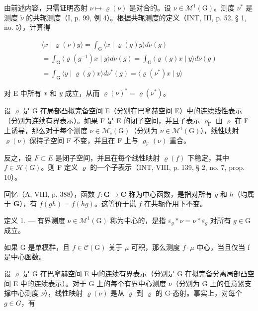 由前述内容，只需证明态射 \(\nu \mapsto \varrho(\nu)\) 是对合的。设 \(\nu \in \mathcal{M}^{1}(\mathrm{G})\)。测度 \(\nu^{*}\) 是测度 \(\check{\nu}\) 的共轭测度（I, p. 99, 例 4）。根据共轭测度的定义（INT, III, p. 52, § 1, no. 5），计算得

\[
\begin{array}{c} \langle x \mid \varrho (\nu) y \rangle = \int_ {\mathrm{G}} \langle x \mid \varrho (g) y \rangle d \nu (g) \\ = \int_ {\mathrm{G}} \langle \varrho (g ^ {- 1}) x \mid y \rangle d \nu (g) = \int_ {\mathrm{G}} \langle \varrho (g) x \mid y \rangle d \check {\nu} (g) \\ = \overline {{\int_ {\mathrm{G}} \langle y \mid \varrho (g) x \rangle d \nu^ {*} (g)}} = \langle \varrho (\nu^ {*}) x \mid y \rangle \end{array}
\]

对 E 中所有 \(x\) 和 \(y\) 成立，从而 \(\varrho(\nu)^{*} = \varrho(\nu^{*})\)。

设 \(\varrho\) 是 G 在局部凸拟完备空间 E（分别在巴拿赫空间 E）中的连续线性表示（分别为连续有界表示）。如果 F 是 E 的闭子空间，并且子表示 \(\varrho_{\mathrm{F}}\) 由 \(\varrho\) 在 F 上诱导，那么对于每个测度 \(\nu \in \mathcal{M}_c(\mathrm{G})\)（分别为 \(\nu \in \mathcal{M}^1 (\mathrm{G})\)），线性映射 \(\varrho (\nu)\) 保持子空间 F 不变，并且在 F 上与 \(\varrho_{\mathrm{F}}(\nu)\) 重合。

反之，设 \(F \subset E\) 是闭子空间，并且在每个线性映射 \(\varrho(f)\) 下稳定，其中 \(f \in \mathcal{H}(G)\)。则 F 定义 \(\varrho\) 的一个子表示（INT, VIII, p. 139, § 2, no. 7, prop. 10）。

回忆（A, VIII, p. 388），函数 \(f \colon \mathbf{G} \to \mathbf{C}\) 称为中心函数，是指对所有 \(g\) 和 \(h\)（均属于 \(\mathbf{G}\)），有 \(f(gh) = f(hg)\)。这等价于说 \(f\) 在共轭作用下不变。

定义 1. --- 有界测度 \(\nu \in \mathcal{M}^{1}(\mathrm{G})\) 称为中心的，是指 \(\varepsilon_{g} * \nu = \nu * \varepsilon_{g}\) 对所有 \(g \in \mathrm{G}\) 成立。

如果 G 是单模群，且 \(f \in \mathcal{C}(\mathrm{G})\) 关于 \(\mu\) 可积，那么测度 \(f \cdot \mu\) 中心，当且仅当 f 是中心函数。

设 \(\varrho\) 是 G 在巴拿赫空间 E 中的连续有界表示（分别是 G 在拟完备分离局部凸空间 E 中的连续表示）。对于 G 上的每个有界中心测度 \(\nu\)（分别为 G 上的任意紧支撑中心测度 \(\nu\)），线性映射 \(\varrho(\nu)\) 是从 \(\varrho\) 到 \(\varrho\) 的 G-态射。事实上，对每个 \(g \in G\)，有

